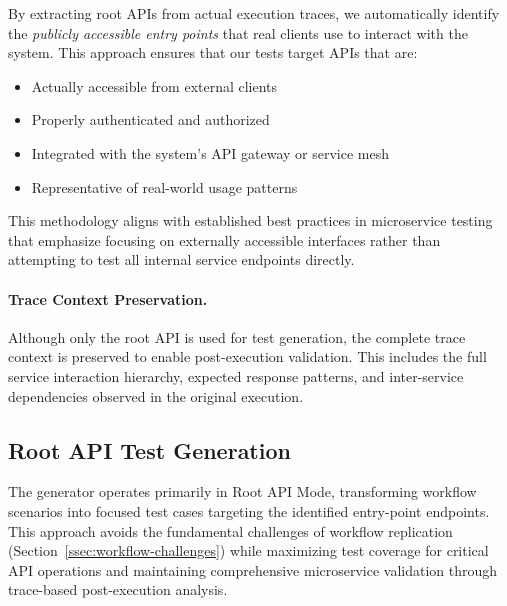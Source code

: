\documentclass[conference]{IEEEtran}
\begin{document}
By extracting root APIs from actual execution traces, we automatically identify the \emph{publicly accessible entry points} that real clients use to interact with the system. This approach ensures that our tests target APIs that are:
\begin{itemize}[leftmargin=*]
\item Actually accessible from external clients
\item Properly authenticated and authorized
\item Integrated with the system's API gateway or service mesh
\item Representative of real-world usage patterns
\end{itemize}

This methodology aligns with established best practices in microservice testing that emphasize focusing on externally accessible interfaces rather than attempting to test all internal service endpoints directly.

\paragraph{Trace Context Preservation.}
Although only the root API is used for test generation, the complete trace context is preserved to enable post-execution validation. This includes the full service interaction hierarchy, expected response patterns, and inter-service dependencies observed in the original execution.

\subsection{Root API Test Generation}
\label{ssec:gen}

The generator operates primarily in Root API Mode, transforming workflow scenarios into focused test cases targeting the identified entry-point endpoints. This approach avoids the fundamental challenges of workflow replication (Section~\ref{ssec:workflow-challenges}) while maximizing test coverage for critical API operations and maintaining comprehensive microservice validation through trace-based post-execution analysis.
\end{document}

